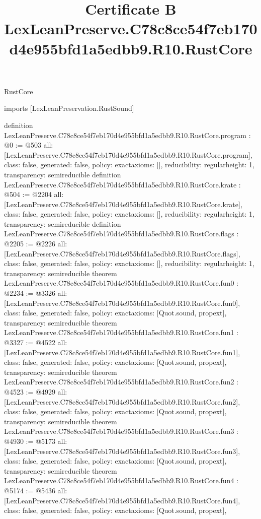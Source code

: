 \begin{lexlean}{RustCore}
\title{Certificate B LexLeanPreserve.C78c8ce54f7eb170d4e955bfd1a5edbb9.R10.RustCore}
\begin{coremodule}
imports [LexLeanPreservation.RustSound]

definition LexLeanPreserve.C78c8ce54f7eb170d4e955bfd1a5edbb9.R10.RustCore.program : @0 := @503 {
  all: [LexLeanPreserve.C78c8ce54f7eb170d4e955bfd1a5edbb9.R10.RustCore.program],
  class: false,
  generated: false,
  policy: exact{axioms: []},
  reducibility: regular{height: 1},
  transparency: semireducible
}
definition LexLeanPreserve.C78c8ce54f7eb170d4e955bfd1a5edbb9.R10.RustCore.krate : @504 := @2204 {
  all: [LexLeanPreserve.C78c8ce54f7eb170d4e955bfd1a5edbb9.R10.RustCore.krate],
  class: false,
  generated: false,
  policy: exact{axioms: []},
  reducibility: regular{height: 1},
  transparency: semireducible
}
definition LexLeanPreserve.C78c8ce54f7eb170d4e955bfd1a5edbb9.R10.RustCore.flags : @2205 := @2226 {
  all: [LexLeanPreserve.C78c8ce54f7eb170d4e955bfd1a5edbb9.R10.RustCore.flags],
  class: false,
  generated: false,
  policy: exact{axioms: []},
  reducibility: regular{height: 1},
  transparency: semireducible
}
theorem LexLeanPreserve.C78c8ce54f7eb170d4e955bfd1a5edbb9.R10.RustCore.fun0 : @2234 := @3326 {
  all: [LexLeanPreserve.C78c8ce54f7eb170d4e955bfd1a5edbb9.R10.RustCore.fun0],
  class: false,
  generated: false,
  policy: exact{axioms: [Quot.sound, propext]},
  transparency: semireducible
}
theorem LexLeanPreserve.C78c8ce54f7eb170d4e955bfd1a5edbb9.R10.RustCore.fun1 : @3327 := @4522 {
  all: [LexLeanPreserve.C78c8ce54f7eb170d4e955bfd1a5edbb9.R10.RustCore.fun1],
  class: false,
  generated: false,
  policy: exact{axioms: [Quot.sound, propext]},
  transparency: semireducible
}
theorem LexLeanPreserve.C78c8ce54f7eb170d4e955bfd1a5edbb9.R10.RustCore.fun2 : @4523 := @4929 {
  all: [LexLeanPreserve.C78c8ce54f7eb170d4e955bfd1a5edbb9.R10.RustCore.fun2],
  class: false,
  generated: false,
  policy: exact{axioms: [Quot.sound, propext]},
  transparency: semireducible
}
theorem LexLeanPreserve.C78c8ce54f7eb170d4e955bfd1a5edbb9.R10.RustCore.fun3 : @4930 := @5173 {
  all: [LexLeanPreserve.C78c8ce54f7eb170d4e955bfd1a5edbb9.R10.RustCore.fun3],
  class: false,
  generated: false,
  policy: exact{axioms: [Quot.sound, propext]},
  transparency: semireducible
}
theorem LexLeanPreserve.C78c8ce54f7eb170d4e955bfd1a5edbb9.R10.RustCore.fun4 : @5174 := @5436 {
  all: [LexLeanPreserve.C78c8ce54f7eb170d4e955bfd1a5edbb9.R10.RustCore.fun4],
  class: false,
  generated: false,
  policy: exact{axioms: [Quot.sound, propext]},
}
\end{coremodule}
\end{lexlean}
